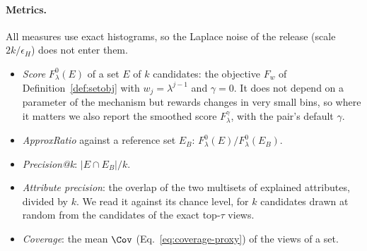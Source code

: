 

\paragraph{Metrics.}
All measures use exact histograms, so the Laplace noise of the release (scale $2k/\epsilon_H$) does not enter them.
\begin{itemize}[leftmargin=*,itemsep=1pt,topsep=2pt]
  \item \emph{Score} $F^0_\lambda(E)$ of a set $E$ of $k$ candidates: the objective $F_w$ of Definition~\ref{def:setobj} with $w_j=\lambda^{j-1}$ and $\gamma=0$. It does not depend on a parameter of the mechanism but rewards changes in very small bins, so where it matters we also report the smoothed score $F^\gamma_\lambda$, with the pair's default $\gamma$.
  \item \emph{ApproxRatio} against a reference set $E_B$: $F^0_\lambda(E)/F^0_\lambda(E_B)$.
  \item \emph{Precision@k}: $|E\cap E_B|/k$.
  \item \emph{Attribute precision}: the overlap of the two multisets of explained attributes, divided by $k$. We read it against its chance level, for $k$ candidates drawn at random from the candidates of the exact top-$\tau$ views.
  \item \emph{Coverage}: the mean $\Cov$ (Eq.~\eqref{eq:coverage-proxy}) of the views of a set.
\end{itemize}


